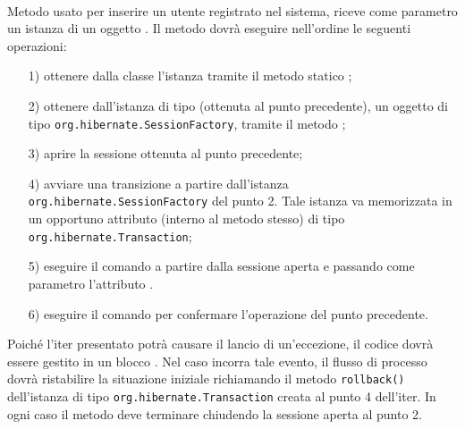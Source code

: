 \begin{description}

	\item{}\\
	Metodo usato per inserire un utente registrato nel sistema, riceve come parametro un istanza di un oggetto . Il metodo dovrà eseguire nell'ordine le seguenti operazioni:
		\begin{itemize}
			\item[1)] ottenere dalla classe  l'istanza tramite il metodo statico ;
			\item[2)] ottenere dall'istanza di tipo  (ottenuta al punto precedente), un oggetto di tipo \texttt{org.hibernate.SessionFactory}, tramite il metodo ;
			\item[3)] aprire la sessione ottenuta al punto precedente;
			\item[4)] avviare una transizione a partire dall'istanza \texttt{org.hibernate.SessionFactory} del punto 2. Tale istanza va memorizzata in un opportuno attributo (interno al metodo stesso) di tipo \texttt{org.hibernate.Transaction};
			\item[5)] eseguire il comando  a partire dalla sessione aperta e passando come parametro l'attributo .
			\item[6)] eseguire il comando  per confermare l'operazione del punto precedente.
		\end{itemize}
		
Poiché l'iter presentato potrà causare il lancio di un'eccezione, il codice dovrà essere gestito in un blocco . Nel caso incorra tale evento, il flusso di processo dovrà ristabilire la situazione iniziale richiamando il metodo \texttt{rollback()} dell'istanza di tipo \texttt{org.hibernate.Transaction} creata al punto 4 dell'iter. In ogni caso il metodo deve terminare chiudendo la sessione aperta al punto 2.


\end{description}
